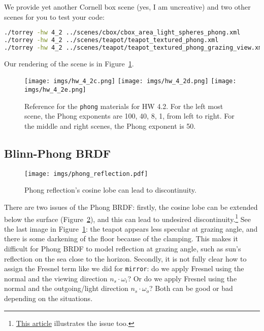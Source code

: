 We provide yet another Cornell box scene (yes, I am uncreative) and two other scenes for you to test your code:
\begin{lstlisting}[language=bash]
./torrey -hw 4_2 ../scenes/cbox/cbox_area_light_spheres_phong.xml
./torrey -hw 4_2 ../scenes/teapot/teapot_textured_phong.xml
./torrey -hw 4_2 ../scenes/teapot/teapot_textured_phong_grazing_view.xml
\end{lstlisting}
Our rendering of the scene is in Figure~\ref{fig:hw_4_2_phong}.

\begin{figure}[ht]
    \centering
    \texttt{[image: imgs/hw\_4\_2c.png]}
    \texttt{[image: imgs/hw\_4\_2d.png]}
    \texttt{[image: imgs/hw\_4\_2e.png]}
    \caption{Reference for the \lstinline{phong} materials for HW 4.2. For the left most scene, the Phong exponents are 100, 40, 8, 1, from left to right. For the middle and right scenes, the Phong exponent is 50.}
    \label{fig:hw_4_2_phong}
\end{figure}

\subsection{Blinn-Phong BRDF}
\begin{figure}[ht]
    \centering
    \texttt{[image: imgs/phong\_reflection.pdf]}
    \caption{Phong reflection's cosine lobe can lead to discontinuity.}
    \label{fig:phong_reflection}
\end{figure}

There are two issues of the Phong BRDF: firstly, the cosine lobe can be extended below the surface (Figure~\ref{fig:phong_reflection}), and this can lead to undesired discontinuity.\footnote{\href{https://learnopengl.com/Advanced-Lighting/Advanced-Lighting}{This article} illustrates the issue too.} See the last image in Figure~\ref{fig:hw_4_2_phong}: the teapot appears less specular at grazing angle, and there is some darkening of the floor because of the clamping. This makes it difficult for Phong BRDF to model reflection at grazing angle, such as sun's reflection on the sea close to the horizon.
Secondly, it is not fully clear how to assign the Fresnel term like we did for \lstinline{mirror}: do we apply Fresnel using the normal and the viewing direction $n_s \cdot \omega_i$? Or do we apply Fresnel using the normal and the outgoing/light direction $n_s \cdot \omega_o$? Both can be good or bad depending on the situations.

